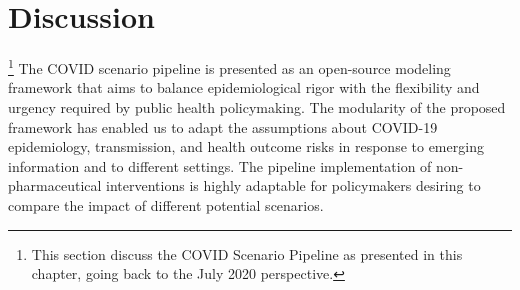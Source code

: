 {%

 


\section{Discussion}\footnote{This section discuss the COVID Scenario Pipeline as presented in this chapter, \ie going back to the July 2020 perspective.}
The COVID scenario pipeline is presented as an open-source modeling framework that aims to balance epidemiological rigor with the flexibility and urgency required by public health policymaking. The modularity of the proposed framework has enabled us to adapt the assumptions about COVID-19 epidemiology, transmission, and health outcome risks in response to emerging information and to different settings. The pipeline implementation of non-pharmaceutical interventions is highly adaptable for policymakers desiring to compare the impact of different potential scenarios.

}

